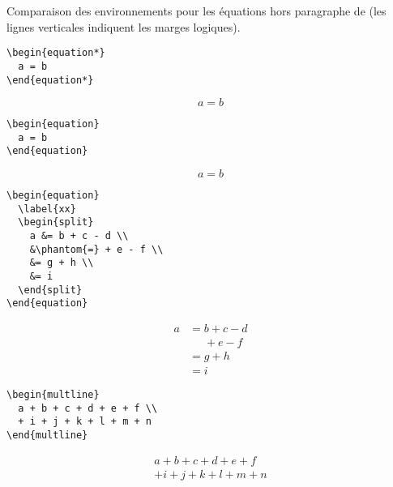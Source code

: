 \begin{table}[p]
  \caption{Comparaison des environnements pour les équations hors
    paragraphe de  (les lignes verticales indiquent les
    marges logiques).}
  \label{tab:math:displays}
  \renewcommand{\theequation}{\arabic{equation}}
  \begin{eqxample}
\begin{lstlisting}
\begin{equation*}
  a = b
\end{equation*}
\end{lstlisting}
    \producing
    \begin{equation*}
      a = b
    \end{equation*}
  \end{eqxample}

  \begin{eqxample}
\begin{lstlisting}
\begin{equation}
  a = b
\end{equation}
\end{lstlisting}
    \producing
    \begin{equation}
      a = b
    \end{equation}
  \end{eqxample}

  \begin{eqxample}
\begin{lstlisting}
\begin{equation}
  \label{xx}
  \begin{split}
    a &= b + c - d \\
    &\phantom{=} + e - f \\
    &= g + h \\
    &= i
  \end{split}
\end{equation}
\end{lstlisting}
    \producing
    \begin{equation}\label{eq:math:xx}
      \begin{split}
        a& =b+c-d\\
        &\phantom{=} +e-f\\
        & =g+h\\
        & =i
      \end{split}
    \end{equation}
  \end{eqxample}

  \begin{eqxample}
\begin{lstlisting}
\begin{multline}
  a + b + c + d + e + f \\
  + i + j + k + l + m + n
\end{multline}
\end{lstlisting}
    \producing
    \begin{multline}
      a+b+c+d+e+f\\
      +i+j+k+l+m+n
    \end{multline}
  \end{eqxample}


\end{table}
